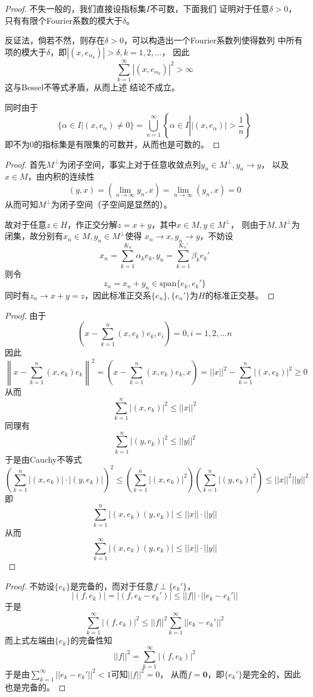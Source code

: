 \documentclass[cn]{homework}
\begin{document}
    \problem
    \begin{proof}
        不失一般的，我们直接设指标集$I$不可数，下面我们
        证明对于任意$\delta>0$，只有有限个Fourier系数的模大于$\delta$。

        反证法，倘若不然，则存在$\delta>0$，可以构造出一个Fourier系数列使得数列
        中所有项的模大于$\delta$，即$|(x,e_{\alpha_k})|>\delta,k=1,2,\ldots$，
        因此
        \[\sum_{k=1}^\infty|(x,e_{\alpha_k})|^2>\infty\]
        这与Bessel不等式矛盾，从而上述
        结论不成立。

        同时由于
        \[\{\alpha\in I|(x,e_\alpha)\neq 0\}
        =\bigcup_{n=1}^\infty\left\{\alpha\in I\left||(x,e_\alpha)|>\frac{1}{n}\right.\right\}\]
        即不为0的指标集是有限集的可数并，从而也是可数的。
    \end{proof}

    \problem
    \begin{proof}
        首先$M^\perp$为闭子空间，事实上对于任意收敛点列$y_n\in M^\perp,y_n\to y$，
        以及$x\in M$，由内积的连续性
        \[(y,x)=\left(\lim_{n\to\infty}y_n,x\right)
        =\lim_{n\to\infty}(y_n,x)=0\]
        从而可知$M^\perp$为闭子空间（子空间是显然的）。

        故对于任意$z\in H$，作正交分解$z=x+y$，其中$x\in M,y\in M^\perp$，
        则由于$M,M^\perp$为闭集，故分别有$x_n\in M,y_n\in M^\perp$使得
        $x_n\to x,y_n\to y$，不妨设
        \[x_n=\sum_{k=1}^{K_n}\alpha_ke_k,
        y_n=\sum_{k=1}^{K_n'}\beta_ke_k'\]
        则令
        \[z_n=x_n+y_n\in\mathrm{span}\{e_k,e_k'\}\]
        同时有$z_n\to x+y=z$，因此标准正交系$\{e_n\},\{e_n'\}$为$H$的标准正交基。
    \end{proof}

    \problem
    \begin{proof}
        由于
        \[\left(x-\sum_{k=1}^n(x,e_k)e_k,e_i\right)=0,i=1,2,\ldots n\]
        因此
        \[\left\|x-\sum_{k=1}^n(x,e_k)e_k\right\|^2
        =\left(x-\sum_{k=1}^n(x,e_k)e_k,x\right)
        =||x||^2-\sum_{k=1}^n|(x,e_k)|^2\geq 0\]
        从而
        \[\sum_{k=1}^n|(x,e_k)|^2\leq ||x||^2\]
        同理有
        \[\sum_{k=1}^n|(y,e_k)|^2\leq ||y||^2\]
        于是由Cauchy不等式
        \[\left(\sum_{k=1}^n|(x,e_k)|\cdot|(y,e_k)|\right)^2
        \leq
        \left(\sum_{k=1}^n|(x,e_k)|^2\right)
        \left(\sum_{k=1}^n|(y,e_k)|^2\right)
        \leq ||x||^2||y||^2\]
        即
        \[\sum_{k=1}^n|(x,e_k)(y,e_k)|\leq
        ||x||\cdot||y||\]
        从而
        \[\sum_{k=1}^\infty|(x,e_k)(y,e_k)|\leq ||x||\cdot||y||\]


    \end{proof}

    \problem
    \begin{proof}
        不妨设$\{e_k\}$是完备的，而对于任意$f\perp\{e_k'\}$，
        \[|(f,e_k)|=|(f,e_k-e_k')|\leq||f||\cdot||e_k-e_k'||\]
        于是
        \[\sum_{k=1}^\infty |(f,e_k)|^2
        \leq||f||^2\sum_{k=1}^\infty||e_k-e_k'||^2\]
        而上式左端由$\{e_k\}$的完备性知
        \[||f||^2=\sum_{k=1}^\infty|(f,e_k)|^2\]
        于是由$\sum_{k=1}^\infty||e_k-e_k'||^2<1$可知$||f||^2=0$，
        从而$f=\boldsymbol 0$，即$\{e_k'\}$是完全的，因此也是完备的。
    \end{proof}
\end{document}

